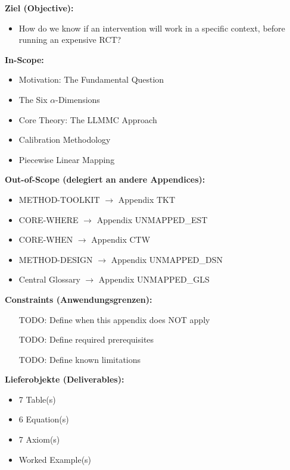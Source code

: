 \begin{tcolorbox}[
    colback=orange!5!white,
    colframe=orange!75!black,
    title={\textbf{Appendix Scope: Ziel / In-Scope / Out-of-Scope / Constraints}},
    fonttitle=\bfseries
]

\textbf{Ziel (Objective):}
\begin{itemize}[nosep]
    \item How do we know if an intervention will work in a specific context,
before running an expensive RCT?
\end{itemize}

\textbf{In-Scope:}
\begin{itemize}[nosep]
    \item Motivation: The Fundamental Question
    \item The Six $\alpha$-Dimensions
    \item Core Theory: The LLMMC Approach
    \item Calibration Methodology
    \item Piecewise Linear Mapping
\end{itemize}

\textbf{Out-of-Scope (delegiert an andere Appendices):}
\begin{itemize}[nosep]
    \item METHOD-TOOLKIT $\rightarrow$ Appendix TKT
    \item CORE-WHERE $\rightarrow$ Appendix UNMAPPED_EST
    \item CORE-WHEN $\rightarrow$ Appendix CTW
    \item METHOD-DESIGN $\rightarrow$ Appendix UNMAPPED_DSN
    \item Central Glossary $\rightarrow$ Appendix UNMAPPED_GLS
\end{itemize}

\textbf{Constraints (Anwendungsgrenzen):}
\begin{itemize}[nosep]
    \item [TODO: Define when this appendix does NOT apply]
    \item [TODO: Define required prerequisites]
    \item [TODO: Define known limitations]
\end{itemize}

\textbf{Lieferobjekte (Deliverables):}
\begin{itemize}[nosep]
    \item 7 Table(s)
    \item 6 Equation(s)
    \item 7 Axiom(s)
    \item Worked Example(s)
\end{itemize}

\end{tcolorbox}


